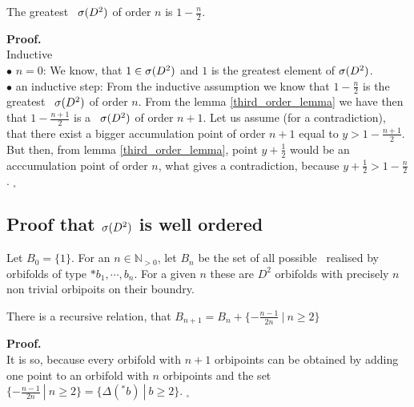 \begin{theorem}\label{greatest \apots}
The greatest \apots\ ${{\sigma}(D^2)}$ of order $n$ is $1-\frac{n}{2}$.
\end{theorem}
\noindent\textbf{Proof.}\\
Inductive \\
$\bullet$ $n=0$: We know, that $1\in {{\sigma}(D^2)}$ and $1$ is the greatest element of ${{\sigma}(D^2)}$. \\
$\bullet$ an inductive step: From the inductive assumption we know that $1-\frac{n}{2}$ is 
the greatest \apots\ ${{\sigma}(D^2)}$ of order $n$. From the lemma \ref{third_order_lemma} we have then 
that $1-\frac{n+1}{2}$ is a \apots\ ${{\sigma}(D^2)}$ of order $n+1$. Let us assume (for a contradiction), 
that there exist a bigger accumulation point of order $n+1$ equal to $y > 1-\frac{n+1}{2}$. 
But then, from lemma \ref{third_order_lemma}, point $y+\frac{1}{2}$ would be an acccumulation 
point 
of order $n$, what gives a contradiction, because $y+\frac{1}{2}>1-\frac{n}{2}$. $_\square$ 

\subsection{Proof that ${{\sigma}(D^2)}$ is well ordered}

\begin{definition} 
Let $B_0 = \{1\}$.
For an $n \in \mathbb{N}_{>0}$, let $B_n$ be the set of all possible \Eoc\ realised 
by orbifolds of type 
$*b_1, \cdots, b_n$. For a given $n$ these are 
$D^2$ orbifolds with precisely $n$ non trivial orbipoits on their boundry.
\end{definition}


\begin{observation}\label{recursive_relation}
There is a recursive relation, that $B_{n+1}=B_n+\{-\frac{n-1}{2n}\ |\ n\geq 2\}$
\end{observation}
\textbf{Proof.} \\
It is so, because every orbifold with $n+1$ orbipoints can be obtained by adding one point 
to an orbifold with $n$ orbipoints and the set 
$\{-\frac{n-1}{2n}\ |\ n\geq 2\} = \{\Delta(^\ast b)\ |\ b \geq 2\}$. $_\square$


